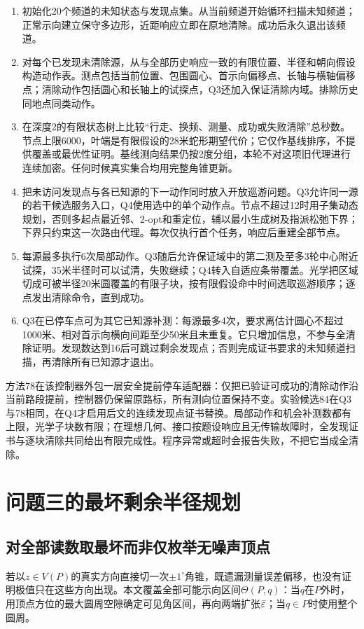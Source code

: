 \documentclass[UTF8,a4paper,zihao=-4,fontset=mac]{ctexart}
\begin{document}
\begin{enumerate}
\item 初始化20个频道的未知状态与发现点集。从当前频道开始循环扫描未知频道；正常示向建立保守多边形，近距响应立即在原地清除。成功后永久退出该频道。
\item 对每个已发现未清除源，从与全部历史响应一致的有限位置、半径和朝向假设构造动作表。测点包括当前位置、包围圆心、首示向偏移点、长轴与横轴偏移点；清除动作包括圆心和长轴上的试探点，Q3还加入保证清除内域。排除历史同地点同类动作。
\item 在深度2的有限状态树上比较“行走、换频、测量、成功或失败清除”总秒数。节点上限6000，叶端是有限假设的28米蛇形期望代价；它仅作基线排序，不提供覆盖或最优性证明。基线测向结果仍按2度分组，本轮不对这项旧代理进行连续加密。任何时候真实集合均用完整角锥更新。
\item 把未访问发现点与各已知源的下一动作同时放入开放巡游问题。Q3允许同一源的若干候选服务入口，Q4使用选中的单个动作点。节点不超过12时用子集动态规划，否则多起点最近邻、2-opt和重定位，辅以最小生成树及指派松弛下界；下界只约束这一次路由代理。每次仅执行首个任务，响应后重建全部节点。
\item 每源最多执行6次局部动作。Q3随后允许保证域中的第二测及至多3轮中心附近试探，35米半径时可以试清，失败继续；Q4转入自适应条带覆盖。光学把区域切成可被半径20米圆覆盖的有限子块，按有限假设命中时间选取巡游顺序；逐点发出清除命令，直到成功。
\item Q3在已停车点可为其它已知源补测：每源最多4次，要求离估计圆心不超过1000米、相对首示向横向间距至少50米且未重复。它只增加信息，不参与全清除证明。发现数达到16后可跳过剩余发现点；否则完成证书要求的未知频道扫描，再清除所有已知源才退出。
\end{enumerate}

方法78在该控制器外包一层安全提前停车适配器：仅把已验证可成功的清除动作沿当前路段提前，控制器仍保留原路标，所有测向位置保持不变。实验候选84在Q3与78相同，在Q4才启用后文的连续发现点证书替换。局部动作和机会补测数都有上限，光学子块数有限；在理想几何、接口按题设响应且无传输故障时，全发现证书与逐块清除共同给出有限完成性。程序异常或超时会报告失败，不把它当成全清除。

\section{问题三的最坏剩余半径规划}
\subsection{对全部读数取最坏而非仅枚举无噪声顶点}
若以$z\in V(P)$的真实方向直接切一次$\pm1^\circ$角锥，既遗漏测量误差偏移，也没有证明极值只在这些方向出现。本文覆盖全部可能示向区间$\Theta(P,q)$：当$q$在$P$外时，用顶点方位的最大圆周空隙确定可见角区间，再向两端扩张$\bar\varepsilon$；当$q\in P$时使用整个圆周。
\end{document}
